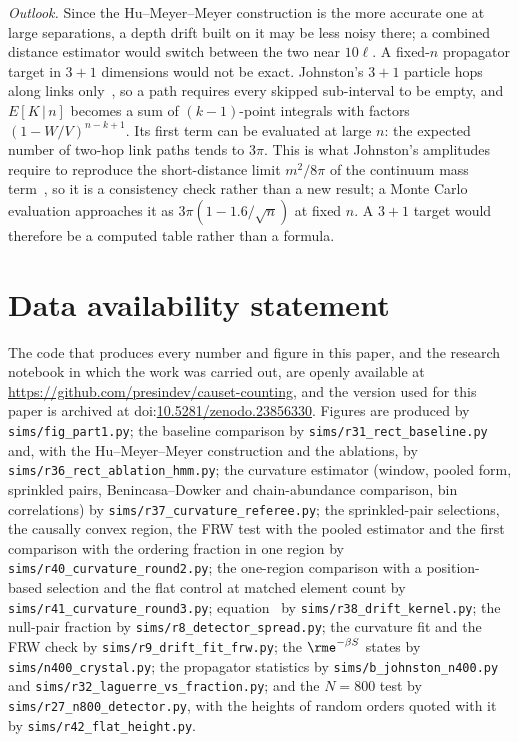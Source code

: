 \documentclass[12pt]{iopart}
\begin{document}
\emph{Outlook.} Since the Hu--Meyer--Meyer construction is the more accurate one at large separations, a depth drift built on it may be less noisy there; a combined distance estimator would switch between the two near $10\ell$. A fixed-$n$ propagator target in $3+1$ dimensions would not be exact. Johnston's $3+1$ particle hops along links only~\cite{Johnston08}, so a path requires every skipped sub-interval to be empty, and $E[K\,|\,n]$ becomes a sum of $(k-1)$-point integrals with factors $(1-W/V)^{n-k+1}$. Its first term can be evaluated at large $n$: the expected number of two-hop link paths tends to $3\pi$. This is what Johnston's amplitudes require to reproduce the short-distance limit $m^2/8\pi$ of the continuum mass term~\cite{Johnston08}, so it is a consistency check rather than a new result; a Monte Carlo evaluation approaches it as $3\pi(1-1.6/\sqrt n)$ at fixed $n$. A $3+1$ target would therefore be a computed table rather than a formula.

\section*{Data availability statement}
{\sloppy
The code that produces every number and figure in this paper, and the research notebook in which the work was carried out, are openly available at \url{https://github.com/presindev/causet-counting}, and the version used for this paper is archived at doi:\href{https://doi.org/10.5281/zenodo.23856330}{10.5281/zenodo.23856330}. Figures are produced by \texttt{sims/fig\_part1.py}; the baseline comparison by \texttt{sims/r31\_rect\_baseline.py} and, with the Hu--Meyer--Meyer construction and the ablations, by \texttt{sims/r36\_rect\_ablation\_hmm.py}; the curvature estimator (window, pooled form, sprinkled pairs, Benincasa--Dowker and chain-abundance comparison, bin correlations) by \texttt{sims/r37\_curvature\_referee.py}; the sprinkled-pair selections, the causally convex region, the FRW test with the pooled estimator and the first comparison with the ordering fraction in one region by \texttt{sims/r40\_curvature\_round2.py}; the one-region comparison with a position-based selection and the flat control at matched element count by \texttt{sims/r41\_curvature\_round3.py}; equation~ by \texttt{sims/r38\_drift\_kernel.py}; the null-pair fraction by \texttt{sims/r8\_detector\_spread.py}; the curvature fit and the FRW check by \texttt{sims/r9\_drift\_fit\_frw.py}; the $\rme^{-\beta S}$ states by \texttt{sims/n400\_crystal.py}; the propagator statistics by \texttt{sims/b\_johnston\_n400.py} and \texttt{sims/r32\_laguerre\_vs\_fraction.py}; and the $N=800$ test by \texttt{sims/r27\_n800\_detector.py}, with the heights of random orders quoted with it by \texttt{sims/r42\_flat\_height.py}.\par}
\end{document}
